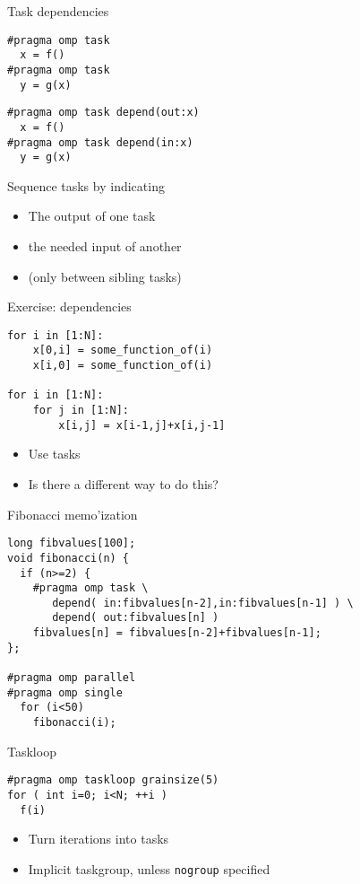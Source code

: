 \begin{numberedframe}{Task dependencies}
\begin{multicols}{2}
\begin{lstlisting}
#pragma omp task
  x = f()
#pragma omp task
  y = g(x)
\end{lstlisting}
\columnbreak
\footnotesize
\begin{lstlisting}
#pragma omp task depend(out:x)
  x = f()
#pragma omp task depend(in:x)
  y = g(x)
\end{lstlisting}
\end{multicols}

 Sequence tasks by indicating
  \begin{itemize}
  \item The output of one task
  \item the needed input of another
  \item (only between sibling tasks)
  \end{itemize}
\end{numberedframe}

\begin{numberedframe}{Exercise: dependencies}
\begin{lstlisting}
for i in [1:N]:
    x[0,i] = some_function_of(i)
    x[i,0] = some_function_of(i)

for i in [1:N]:
    for j in [1:N]:
        x[i,j] = x[i-1,j]+x[i,j-1]
\end{lstlisting}
  \begin{itemize}
  \item Use tasks
  \item Is there a different way to do this?
  \end{itemize}
\end{numberedframe}

\begin{numberedframe}{Fibonacci memo'ization}
\begin{lstlisting}
long fibvalues[100];
void fibonacci(n) {
  if (n>=2) {
    #pragma omp task \
       depend( in:fibvalues[n-2],in:fibvalues[n-1] ) \
       depend( out:fibvalues[n] )
    fibvalues[n] = fibvalues[n-2]+fibvalues[n-1];
};

#pragma omp parallel
#pragma omp single
  for (i<50)
    fibonacci(i);
\end{lstlisting}
\end{numberedframe}


\begin{numberedframe}{Taskloop}
\begin{lstlisting}
#pragma omp taskloop grainsize(5)
for ( int i=0; i<N; ++i )
  f(i)
\end{lstlisting}
  \begin{itemize}
  \item Turn iterations into tasks
  \item Implicit taskgroup, unless \lstinline{nogroup} specified
  \end{itemize}
\end{numberedframe}

\endinput

\begin{numberedframe}{}
\begin{lstlisting}
\end{lstlisting}
  \begin{itemize}
  \item 
  \end{itemize}
\end{numberedframe}

